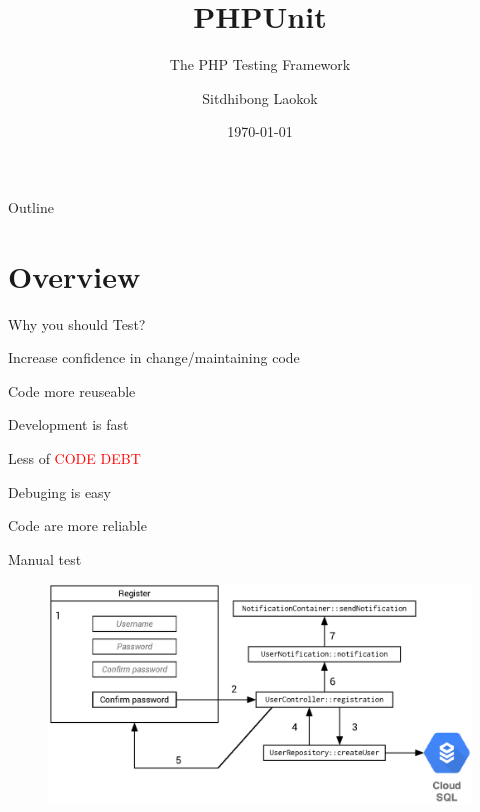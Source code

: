 \documentclass[14pt]{beamer}
\title{PHPUnit}
\subtitle{The PHP Testing Framework}
\author{Sitdhibong Laokok}
\institute{Computer Engineering}
\date{\today}
\begin{document}
\begin{frame}[plain]
\maketitle
\end{frame}

\begin{frame}[plain]{Outline}
    \tableofcontents
\end{frame}

\section{Overview}
\begin{frame}[plain]{Why you should Test?}
    \begin{fullpageitemize}
        \item<1-> Increase confidence in change/maintaining code 
        \item<2-> Code more reuseable 
        \item<3-> Development is fast
        \item<4-> Less of \textcolor{red}{CODE DEBT}
        \item<5-> Debuging is easy
        \item<6-> Code are more reliable
    \end{fullpageitemize}
\end{frame}

\begin{frame}[plain]{Manual test}
    \begin{figure}
        \center
        \includegraphics[width=\textwidth]{normal-test}
    \end{figure}
\end{frame}
\end{document}
